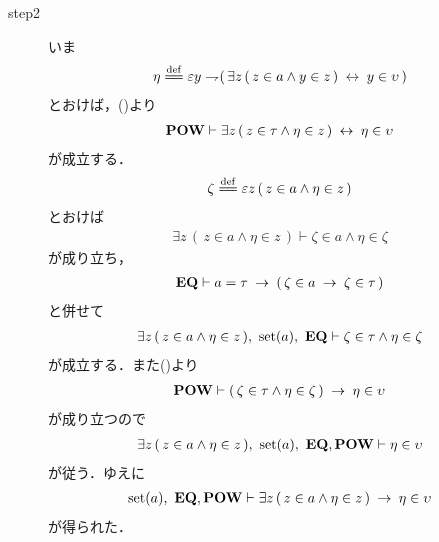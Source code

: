 \begin{sketch}
\begin{description}
			\item[step2]
				いま
				\begin{align}
					\eta \defeq \varepsilon y \negation  (\, \exists z\, (\, z \in a \wedge y \in z\, ) \lrarrow y \in \upsilon\, )
				\end{align}
				とおけば，()より
				\begin{align}
					\mbox{{\bf POW}} \vdash \exists z\, (\, z \in \tau \wedge \eta \in z\, )
					\hspace{0.25em}\leftrightarrow\hspace{0.25em} \eta \in \upsilon
				\end{align}
				が成立する．
				\begin{align}
					\zeta \defeq \varepsilon z\, (\, z \in a \wedge \eta \in z\, )
				\end{align}
				とおけば
				\begin{align}
					\exists z\, (\, z \in a \wedge \eta \in z\, )
					\vdash \zeta \in a \wedge \eta \in \zeta
				\end{align}
				が成り立ち，
				\begin{align}
					\mbox{{\bf EQ}} \vdash a = \tau \hspace{0.25em}\rightarrow\hspace{0.25em} (\, \zeta \in a \hspace{0.25em}\rightarrow\hspace{0.25em} \zeta \in \tau\, )
				\end{align}
				と併せて
				\begin{align}
					\exists z\, (\, z \in a \wedge \eta \in z\, ),\ \set{a},\ \EQAX
					\vdash \zeta \in \tau \wedge \eta \in \zeta
				\end{align}
				が成立する．また()より
				\begin{align}
					\mbox{{\bf POW}} \vdash (\, \zeta \in \tau \wedge \eta \in \zeta\, )
					\hspace{0.25em}\rightarrow\hspace{0.25em} \eta \in \upsilon
				\end{align}
				が成り立つので
				\begin{align}
					\exists z\, (\, z \in a \wedge \eta \in z\, ),\ \set{a},\ \EQAX,\POWAX \vdash \eta \in \upsilon
				\end{align}
				が従う．ゆえに
				\begin{align}
					\operatorname*{set} (a),\ \mbox{{\bf EQ}},\mbox{{\bf POW}} \vdash 
					\exists z\, (\, z \in a \wedge \eta \in z\, ) \hspace{0.25em}\rightarrow\hspace{0.25em} \eta \in \upsilon
					\label{fom:union_of_a_set_is_a_set_2}
				\end{align}
				が得られた．
				

\end{description}
\end{sketch}
